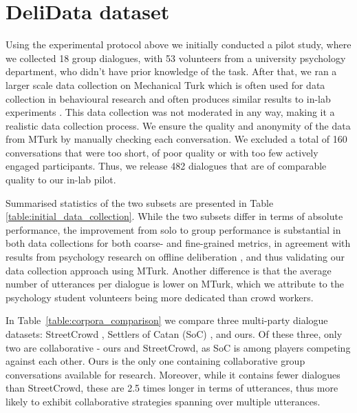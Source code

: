\documentclass[acmsmall,manuscript,screen]{acmart}
\newcommand\delidata{DeliData }
\begin{document}
\section{\delidata dataset}
\label{sec:delidata}

Using the experimental protocol above we initially conducted a pilot study, where we collected 18 group dialogues, with 53 volunteers from a university psychology department, who didn't have prior knowledge of the task.
After that, we ran a larger scale data collection on Mechanical Turk which is often used for data collection in behavioural research and often produces similar results to in-lab experiments  \cite{crump2013evaluating}. 
This data collection was not moderated in any way, making it a realistic data collection process. We ensure the quality and anonymity of the data from MTurk by manually checking each conversation. We excluded a total of 160 conversations that were too short, of poor quality or with too few actively engaged participants. Thus, we release 482 dialogues that are of comparable quality to our in-lab pilot.


 

Summarised statistics of the two subsets are presented in Table \ref{table:initial_data_collection}. While the two subsets differ in terms of absolute performance, the improvement from solo to group performance is substantial in both data collections for both coarse- and fine-grained metrics,  
in agreement with results from psychology research on offline deliberation \citep{mercier2011humans}, and thus validating our data collection approach using MTurk.
Another difference is that the average number of utterances per dialogue is lower on MTurk, which we attribute to the psychology student volunteers being more dedicated than crowd workers.

\par

In Table~\ref{table:corpora_comparison} we compare three multi-party dialogue datasets: StreetCrowd \cite{niculae2016conversational}, Settlers of Catan (SoC) \cite{afantenos2012modelling}, and ours. Of these three, only two are collaborative - ours and StreetCrowd, as SoC is among players competing against each other. Ours is the only one containing collaborative group conversations available for research. Moreover, while it contains fewer dialogues than StreetCrowd, these are 2.5 times longer in terms of utterances, thus more likely to exhibit collaborative strategies spanning over multiple utterances.
\end{document}
